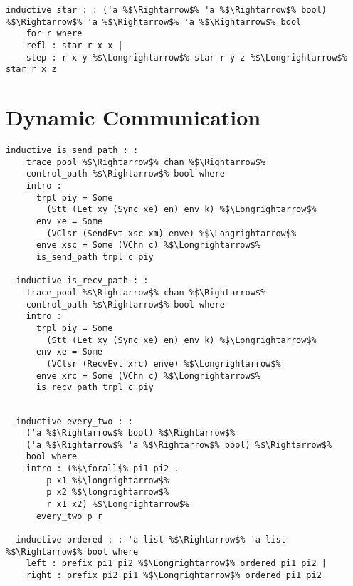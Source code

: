 \documentclass{article}
\begin{document}
\begin{lstlisting}[style=codestyle1, escapechar=\%]
  inductive star : : ('a %$\Rightarrow$% 'a %$\Rightarrow$% bool) %$\Rightarrow$% 'a %$\Rightarrow$% 'a %$\Rightarrow$% bool
    for r where
    refl : star r x x |
    step : r x y %$\Longrightarrow$% star r y z %$\Longrightarrow$% star r x z
  \end{lstlisting}



\section{Dynamic Communication}

\begin{lstlisting}[style=codestyle1, escapechar=\%]
  inductive is_send_path : :
    trace_pool %$\Rightarrow$% chan %$\Rightarrow$%
    control_path %$\Rightarrow$% bool where
    intro :
      trpl piy = Some
        (Stt (Let xy (Sync xe) en) env k) %$\Longrightarrow$%
      env xe = Some
        (VClsr (SendEvt xsc xm) enve) %$\Longrightarrow$%
      enve xsc = Some (VChn c) %$\Longrightarrow$%
      is_send_path trpl c piy

  inductive is_recv_path : :
    trace_pool %$\Rightarrow$% chan %$\Rightarrow$%
    control_path %$\Rightarrow$% bool where
    intro :
      trpl piy = Some
        (Stt (Let xy (Sync xe) en) env k) %$\Longrightarrow$%
      env xe = Some
        (VClsr (RecvEvt xrc) enve) %$\Longrightarrow$%
      enve xrc = Some (VChn c) %$\Longrightarrow$%
      is_recv_path trpl c piy

  \end{lstlisting}
\begin{lstlisting}[style=codestyle1, escapechar=\%]

  inductive every_two : :
    ('a %$\Rightarrow$% bool) %$\Rightarrow$%
    ('a %$\Rightarrow$% 'a %$\Rightarrow$% bool) %$\Rightarrow$%
    bool where
    intro : (%$\forall$% pi1 pi2 .
        p x1 %$\longrightarrow$%
        p x2 %$\longrightarrow$%
        r x1 x2) %$\Longrightarrow$%
      every_two p r

  inductive ordered : : 'a list %$\Rightarrow$% 'a list %$\Rightarrow$% bool where
    left : prefix pi1 pi2 %$\Longrightarrow$% ordered pi1 pi2 |
    right : prefix pi2 pi1 %$\Longrightarrow$% ordered pi1 pi2

  \end{lstlisting}
\end{document}
